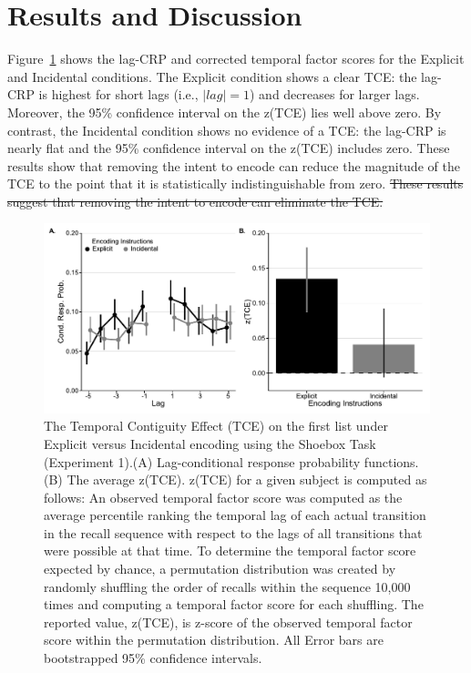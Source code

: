 \documentclass[man,natbib,floatsintext]{apa6} %
\begin{document}
\section{Results and Discussion}

Figure~\ref{e1_l1_crp} shows the lag-CRP and corrected temporal factor scores for the Explicit and Incidental conditions. The Explicit condition shows a clear TCE: the lag-CRP is highest for short lags (i.e., $|lag|=1$) and decreases for larger lags. Moreover, the 95\% confidence interval on the z(TCE) lies well above zero. By contrast, the Incidental condition shows no evidence of a TCE: the lag-CRP is nearly flat and the 95\% confidence interval on the z(TCE) includes zero. \color{red} These results show that removing the intent to encode can reduce the magnitude of the TCE to the point that it is statistically indistinguishable from zero.\color{black}  \st{These results suggest that removing the intent to encode can eliminate the TCE.}



\newcommand\paneltext{(A) Lag-conditional response probability functions. (B) The average z(TCE). z(TCE) for a given subject is computed as follows: An observed temporal factor score was computed as the average percentile ranking the temporal lag of each actual transition in the recall sequence with respect to the lags of all transitions that were possible at that time. To determine the temporal factor score expected by chance, a permutation distribution was created by randomly shuffling the order of recalls within the sequence 10,000 times and computing a temporal factor score for each shuffling. The reported value, z(TCE), is z-score of the observed temporal factor score within the permutation distribution. All Error bars are bootstrapped 95\% confidence intervals.}
\begin{figure}
\includegraphics{figures/E1_crp_list1.pdf}
\caption{The Temporal Contiguity Effect (TCE) on the first list under Explicit versus Incidental encoding using the Shoebox Task (Experiment 1).\paneltext}
\label{e1_l1_crp}
\end{figure}
\end{document}
